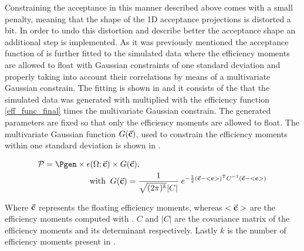 Constraining the acceptance in this manner described above comes with a small penalty, meaning that the shape of the 1D acceptance
projections is distorted a bit. In order to undo this distortion and describe better the acceptance shape an additional step is implemented. 
As it was previously mentioned the acceptance function of  is further fitted to the simulated data where the efficiency
moments are allowed to float with Gaussian constraints of one standard deviation and properly taking into account their correlations by
means of a multivariate Gaussian constrain. The fitting \pdf is shown in  and it consists of the \pdf that the simulated 
data was generated with multiplied with the efficiency function \eqref{eff_func_final} times the multivariate Gaussian constrain. 
The generated parameters are fixed so that only the efficiency moments are allowed to float.     
The multivariate Gaussian function $G(\vec{\bf{c}})$, used to constrain the efficiency moments within one standard deviation is shown in .

\begin{center}
\begin{align}
  \mathcal{P}= \Pgen \times\epsilon(\Omega;\vec{\bf c})&  \times G(\vec{\bf{c}}), \nonumber\\ 
  \text{with} \;\; & G(\vec{\bf{c}}) = \frac{1}{\sqrt{(2\pi)^k}|C|} \; e^{-\frac{1}{2}(  \vec{\bf{c}} - <{\bf{c}}>  )^{\text{T}} C^{-1} (\vec{\bf{c}} - <{\bf{c}}> ) }
  \label{mvm_constr}
\end{align}
\end{center}

\noindent Where $\vec{\bf c}$ represents the floating efficiency moments, whereas $<\vec{\bf c}>$ are the efficiency moments computed
with . $C$ and $|C|$ are the covariance matrix of the efficiency moments and its determinant respectively.
Lastly $k$ is the number of efficiency moments present in . 

